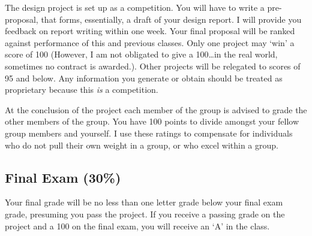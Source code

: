 \documentclass[10pt]{article}
\newcommand{\matlab}{\href{http://www.mathworks.com}{M{\small ATLAB}}}
\begin{document}
The design project is set up as a competition. You will have to write a pre-proposal, that forms, essentially, a draft of your design report. I will provide you feedback on report writing within one week. Your final proposal will be ranked against performance of this and previous classes. Only one project may `win' a score of 100 (However, I am not obligated to give a 100\ldots in the real world, sometimes no contract is awarded.). Other projects will be relegated to scores of 95 and below. Any information you generate or obtain should be treated as proprietary because this \emph{is} a competition.  

At the conclusion of the project each member of the group is advised to grade the other members of the group. You have 100 points to divide amongst your fellow group members and yourself. I use these ratings to compensate for individuals who do not pull their own weight in a group, or who excel within a group. 

\subsection*{Final Exam (30\%)}
Your final grade will be no less than one letter grade below your final exam grade, presuming you pass the project. If you receive a passing grade on the  project and a 100 on the final exam, you will receive an `A' in the class. 



\end{document}
